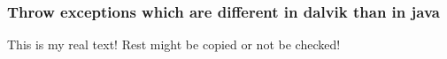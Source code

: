\subsubsection{Throw exceptions which are different in dalvik than in java} \label{subsubsection:counter-reengineering-break-exception}
This is my real text! Rest might be copied or not be checked!
